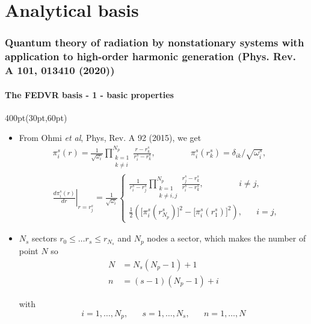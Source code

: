 \section{Analytical basis}

\begin{frame}
\frametitle{Quantum theory of radiation by nonstationary systems 
	with application to high-order harmonic generation
        (Phys. Rev. A 101, 013410 (2020))}
	\framesubtitle{The FEDVR basis - 1 - basic properties}


\begin{textblock*}{400pt}(30pt,60pt)
\footnotesize
\begin{itemize}
\item From Ohmi \textit{et al}, Phys, Rev. A 92 (2015), we get
\begin{align}
& \pi_i^s (r) = \frac{1}{\sqrt{\omega_i}} 
       \prod_{\substack{k=1 \\ k\neq i}}^{N_p}
       \frac{r-r_k^s}{r_i^s - r_k^s}, \hspace{50pt} 
    \pi_i^s(r_k^s) = \delta_{ik}/\sqrt{\omega_i^s},  \\
& \left.\frac{d\pi_i^s (r)}{dr}\right|_{r=r_j^s} 
       =  \frac{1}{\sqrt{\omega_i}} \left\lbrace
      \begin{array}{l} 
       \frac{1}{r_i^s - r_j^s}\prod_{\substack{k=1 \\ k\neq i,j}}^{N_p}
       \frac{r_j^s - r_k^s}{r_i^s - r_k^s}, \hspace{50pt} i \neq j, \\
       \frac{1}{2}\left(\Big[\pi_i^s(r_{N_p}^s)\Big]^2 
       - \Big[\pi_i^s(r_1^s)\Big]^2\right), \hspace{20pt} i=j,
\end{array}\right. \label{eqn:diff_dvr_basis_nodes}
\end{align}

\item $N_s$ sectors $r_0 \leqslant  \ldots r_s \leqslant r_{N_s}$
and $N_p$ nodes a sector, which makes the number of point $N$ so
\begin{align}
N & = N_s(N_p-1) + 1     \\
n & = (s-1)(N_p-1) + i
\end{align}

with
\begin{equation}
i = 1, \ldots, N_p,\hspace{20pt}
s = 1, \ldots, N_s, \hspace{20pt}
n = 1, \ldots, N    \nonumber
\end{equation}

\end{itemize}
\end{textblock*}

\end{frame}




